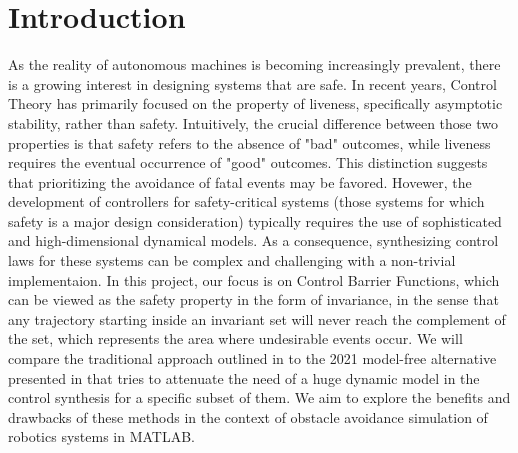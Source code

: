 \section*{Introduction}
As the reality of autonomous machines is becoming increasingly prevalent, there is a growing interest in designing systems that are safe. In recent years, Control Theory has primarily focused on the property of liveness, specifically asymptotic stability, rather than safety.
Intuitively, the crucial difference between those two properties is  that safety refers to the absence of "bad" outcomes, while liveness requires the eventual occurrence of "good" outcomes. This distinction suggests that prioritizing the avoidance of fatal events may be favored.
Hovewer, the development of controllers for safety-critical systems (those systems for which safety is a major design consideration) typically requires the use of sophisticated and high-dimensional dynamical models. As a consequence, synthesizing control laws for these systems can be complex and challenging  with a non-trivial implementaion. 
In this project, our focus is on Control Barrier Functions, which can be viewed as the safety property in the form of invariance, in the sense that any trajectory starting inside an invariant set will never reach the complement of the set, which represents the area where undesirable events occur. 
We will compare the traditional approach outlined in \cite{cbf} to the 2021 model-free alternative presented in \cite{mfcbf} that tries to attenuate the need of a huge dynamic model in the control synthesis for a specific subset of them. We aim to explore the benefits and drawbacks of these methods in the context of obstacle avoidance simulation of robotics systems in MATLAB.



